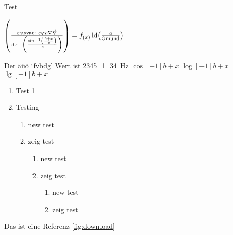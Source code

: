 \documentclass{article}
\begin{document}


Test

$\bracfrac{\epsilon\phi\rho\text{var: }\varepsilon\varphi\varrho\nablanovec\nabla}{\d x - \l(\frac{\sin[-1](\frac{b+x}{c})}{c}\r)} = \f{f}{x} \ld(\frac{a}{\SI{3}{\m und}})$

Der äüö \lq fvbdg\rq{} Wert ist \SI{2345(34)}{\Hz}
$\cos[-1]{{b+x}}$
$\log[-1]{{b+x}}$
$\lg[-1]{{b+x}}$

\begin{enumerate}
	\item Test 1
	\item Testing
	\begin{enumerate}
		\item new test
		\item zeig test
		\begin{enumerate}
			\item new test
			\item zeig test
			\begin{enumerate}
				\item new test
				\item zeig test
			\end{enumerate}
		\end{enumerate}
	\end{enumerate}
\end{enumerate}

Das ist eine Referenz \ref{fig:download}
\end{document}
